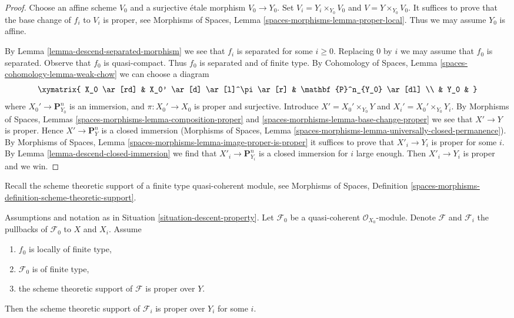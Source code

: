 \begin{proof}
Choose an affine scheme $V_0$ and a surjective \'etale morphism $V_0 \to Y_0$.
Set $V_i = Y_i \times_{Y_0} V_0$ and $V = Y \times_{Y_0} V_0$.
It suffices to prove that the base change of $f_i$ to $V_i$ is
proper, see Morphisms of Spaces, Lemma
\ref{spaces-morphisms-lemma-proper-local}.
Thus we may assume $Y_0$ is affine.

\medskip\noindent
By Lemma \ref{lemma-descend-separated-morphism} we see that
$f_i$ is separated for some $i \geq 0$. Replacing
$0$ by $i$ we may assume that $f_0$ is separated.
Observe that $f_0$ is quasi-compact. Thus $f_0$ is separated and
of finite type. By
Cohomology of Spaces, Lemma \ref{spaces-cohomology-lemma-weak-chow}
we can choose a diagram
$$
\xymatrix{
X_0 \ar[rd] & X_0' \ar[d] \ar[l]^\pi \ar[r] & \mathbf{P}^n_{Y_0} \ar[dl] \\
& Y_0 &
}
$$
where $X_0' \to \mathbf{P}^n_{Y_0}$ is an immersion, and
$\pi : X_0' \to X_0$ is proper and surjective. Introduce
$X' = X_0' \times_{Y_0} Y$ and $X_i' = X_0' \times_{Y_0} Y_i$.
By Morphisms of Spaces, Lemmas
\ref{spaces-morphisms-lemma-composition-proper} and
\ref{spaces-morphisms-lemma-base-change-proper}
we see that $X' \to Y$ is proper. Hence $X' \to \mathbf{P}^n_Y$ is
a closed immersion (Morphisms of Spaces, Lemma
\ref{spaces-morphisms-lemma-universally-closed-permanence}). By
Morphisms of Spaces, Lemma \ref{spaces-morphisms-lemma-image-proper-is-proper}
it suffices to prove that $X'_i \to Y_i$ is proper for some $i$.
By Lemma \ref{lemma-descend-closed-immersion}
we find that $X'_i \to \mathbf{P}^n_{Y_i}$ is
a closed immersion for $i$ large enough. Then $X'_i \to Y_i$
is proper and we win.
\end{proof}

\noindent
Recall the scheme theoretic support of
a finite type quasi-coherent module, see
Morphisms of Spaces, Definition
\ref{spaces-morphisms-definition-scheme-theoretic-support}.

\begin{lemma}
\label{lemma-eventually-proper-support}
Assumptions and notation as in Situation \ref{situation-descent-property}.
Let $\mathcal{F}_0$ be a quasi-coherent $\mathcal{O}_{X_0}$-module.
Denote $\mathcal{F}$ and $\mathcal{F}_i$ the pullbacks of
$\mathcal{F}_0$ to $X$ and $X_i$. Assume
\begin{enumerate}
\item $f_0$ is locally of finite type,
\item $\mathcal{F}_0$ is of finite type,
\item the scheme theoretic support of $\mathcal{F}$ is proper over $Y$.
\end{enumerate}
Then the scheme theoretic support of $\mathcal{F}_i$ is proper over $Y_i$
for some $i$.
\end{lemma}

